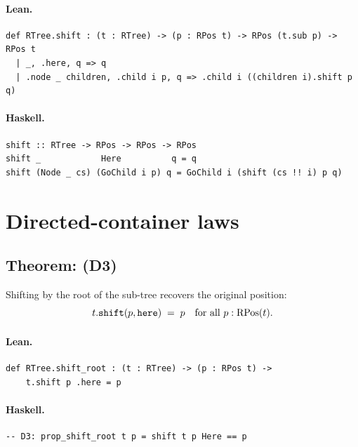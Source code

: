 \documentclass[11pt,a4paper]{article}
\begin{document}
\paragraph{Lean.}
\begin{lstlisting}[style=lean]
def RTree.shift : (t : RTree) -> (p : RPos t) -> RPos (t.sub p) -> RPos t
  | _, .here, q => q
  | .node _ children, .child i p, q => .child i ((children i).shift p q)
\end{lstlisting}

\paragraph{Haskell.}
\begin{lstlisting}[style=haskell]
shift :: RTree -> RPos -> RPos -> RPos
shift _            Here          q = q
shift (Node _ cs) (GoChild i p) q = GoChild i (shift (cs !! i) p q)
\end{lstlisting}


\section{Directed-container laws}

\subsection{Theorem:  (D3)}

\begin{thm}
Shifting by the root of the sub-tree recovers the original position:
\[
  t.\texttt{shift}(p, \texttt{here}) \;=\; p
  \quad\text{for all } p : \mathrm{RPos}(t).
\]
\end{thm}

\paragraph{Lean.}
\begin{lstlisting}[style=lean]
def RTree.shift_root : (t : RTree) -> (p : RPos t) ->
    t.shift p .here = p
\end{lstlisting}

\paragraph{Haskell.}
\begin{lstlisting}[style=haskell]
-- D3: prop_shift_root t p = shift t p Here == p
\end{lstlisting}
\end{document}
